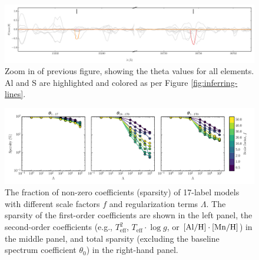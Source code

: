 \documentclass[12pt,preprint]{aastex}
\newcommand{\logg}{\log g}
\newcommand{\Teff}{T_{\mathrm{eff}}}
\begin{document}
\begin{figure}[p]
\includegraphics[width=\textwidth]{sparse-first-order-coefficients-zoom.pdf}
\caption{Zoom in of previous figure, showing the theta values for all elements. Al and S are highlighted and colored as per Figure \ref{fig:inferring-lines}.\label{fig:inferring-lines2}}
\end{figure}


\begin{figure}[p]
\includegraphics[width=\textwidth]{sparsity.pdf}
\caption{The fraction of non-zero coefficients (sparsity) of 17-label models with different scale factors $f$ and regularization terms $\Lambda$.  The sparsity of the first-order coefficients are shown in the left panel, the second-order coefficients (e.g., $\Teff^2$, $\Teff\cdot\logg$, or $[\rm{Al}/\rm{H}]\cdot[\rm{Mn}/\rm{H}]$) in the middle panel, and total sparsity (excluding the baseline spectrum coefficient $\theta_0$) in the right-hand panel.\label{fig:sparsity}}
\end{figure}
\end{document}
